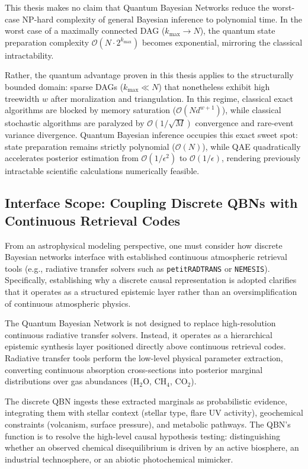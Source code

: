 This thesis makes no claim that Quantum Bayesian Networks reduce the worst-case NP-hard complexity of general Bayesian inference to polynomial time. In the worst case of a maximally connected DAG ($k_{\max} \to N$), the quantum state preparation complexity $\mathcal{O}(N \cdot 2^{k_{\max}})$ becomes exponential, mirroring the classical intractability. 

Rather, the quantum advantage proven in this thesis applies to the structurally bounded domain: sparse DAGs ($k_{\max} \ll N$) that nonetheless exhibit high treewidth $w$ after moralization and triangulation. In this regime, classical exact algorithms are blocked by memory saturation ($\mathcal{O}(N d^{w+1})$), while classical stochastic algorithms are paralyzed by $\mathcal{O}(1/\sqrt{M})$ convergence and rare-event variance divergence. Quantum Bayesian inference occupies this exact sweet spot: state preparation remains strictly polynomial ($\mathcal{O}(N)$), while QAE quadratically accelerates posterior estimation from $\mathcal{O}(1/\epsilon^2)$ to $\mathcal{O}(1/\epsilon)$, rendering previously intractable scientific calculations numerically feasible.

\subsection{Interface Scope: Coupling Discrete QBNs with Continuous Retrieval Codes}
From an astrophysical modeling perspective, one must consider how discrete Bayesian networks interface with established continuous atmospheric retrieval tools (e.g., radiative transfer solvers such as \texttt{petitRADTRANS} or \texttt{NEMESIS}). Specifically, establishing why a discrete causal representation is adopted clarifies that it operates as a structured epistemic layer rather than an oversimplification of continuous atmospheric physics.

The Quantum Bayesian Network is not designed to replace high-resolution continuous radiative transfer solvers. Instead, it operates as a hierarchical epistemic synthesis layer positioned directly above continuous retrieval codes. Radiative transfer tools perform the low-level physical parameter extraction, converting continuous absorption cross-sections into posterior marginal distributions over gas abundances ($\mathrm{H}_2\mathrm{O}$, $\mathrm{CH}_4$, $\mathrm{CO}_2$). 

The discrete QBN ingests these extracted marginals as probabilistic evidence, integrating them with stellar context (stellar type, flare UV activity), geochemical constraints (volcanism, surface pressure), and metabolic pathways. The QBN's function is to resolve the high-level causal hypothesis testing: distinguishing whether an observed chemical disequilibrium is driven by an active biosphere, an industrial technosphere, or an abiotic photochemical mimicker.

